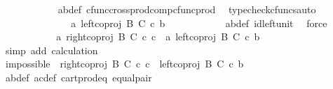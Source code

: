 \begin{isabellebody}
\ \ \ \ \ \ \ \ \ \ \isamarkupfalse%
\ a{\isacharprime}{\kern0pt}b{\isacharprime}{\kern0pt}{\isacharunderscore}{\kern0pt}def\ cfunc{\isacharunderscore}{\kern0pt}cross{\isacharunderscore}{\kern0pt}prod{\isacharunderscore}{\kern0pt}comp{\isacharunderscore}{\kern0pt}cfunc{\isacharunderscore}{\kern0pt}prod\ \isamarkupfalse%
\ {\isacharparenleft}{\kern0pt}typecheck{\isacharunderscore}{\kern0pt}cfuncs{\isacharcomma}{\kern0pt}auto{\isacharparenright}{\kern0pt}\isanewline
\ \ \ \ \ \ \ \ \isamarkupfalse%
\ \isamarkupfalse%
\ {\isachardoublequoteopen}{\isachardot}{\kern0pt}{\isachardot}{\kern0pt}{\isachardot}{\kern0pt}\ {\isacharequal}{\kern0pt}\ \ {\isasymlangle}a{\isacharprime}{\kern0pt}{\isacharcomma}{\kern0pt}\ left{\isacharunderscore}{\kern0pt}coproj\ B\ C\ {\isasymcirc}\isactrlsub c\ b{\isacharprime}{\kern0pt}{\isasymrangle}{\isachardoublequoteclose}\isanewline
\ \ \ \ \ \ \ \ \ \ \isamarkupfalse%
\ a{\isacharprime}{\kern0pt}b{\isacharprime}{\kern0pt}{\isacharunderscore}{\kern0pt}def\ id{\isacharunderscore}{\kern0pt}left{\isacharunderscore}{\kern0pt}unit{}\ \isamarkupfalse%
\ force\isanewline
\ \ \ \ \ \ \ \ \isamarkupfalse%
\ \isamarkupfalse%
\ {\isachardoublequoteopen}{\isasymlangle}a{\isacharcomma}{\kern0pt}\ right{\isacharunderscore}{\kern0pt}coproj\ B\ C\ {\isasymcirc}\isactrlsub c\ c{\isasymrangle}\ {\isacharequal}{\kern0pt}\ {\isasymlangle}a{\isacharprime}{\kern0pt}{\isacharcomma}{\kern0pt}\ left{\isacharunderscore}{\kern0pt}coproj\ B\ C\ {\isasymcirc}\isactrlsub c\ b{\isacharprime}{\kern0pt}{\isasymrangle}{\isachardoublequoteclose}\isanewline
\ \ \ \ \ \ \ \ \ \ \isamarkupfalse%
\ {\isacharparenleft}{\kern0pt}simp\ add{\isacharcolon}{\kern0pt}\ calculation{\isacharparenright}{\kern0pt}\isanewline
\ \ \ \ \ \ \isamarkupfalse%
\ \ \ \ \ \ \ \ \isanewline
\ \ \ \ \ \ \isamarkupfalse%
\ \isamarkupfalse%
\ impossible{\isacharcolon}{\kern0pt}\ \ {\isachardoublequoteopen}right{\isacharunderscore}{\kern0pt}coproj\ B\ C\ {\isasymcirc}\isactrlsub c\ c\ {\isacharequal}{\kern0pt}\ left{\isacharunderscore}{\kern0pt}coproj\ B\ C\ {\isasymcirc}\isactrlsub c\ b{\isacharprime}{\kern0pt}{\isachardoublequoteclose}\isanewline
\ \ \ \ \ \ \ \ \ \ \isamarkupfalse%
\ a{\isacharprime}{\kern0pt}b{\isacharprime}{\kern0pt}{\isacharunderscore}{\kern0pt}def\ ac{\isacharunderscore}{\kern0pt}def\ cart{\isacharunderscore}{\kern0pt}prod{\isacharunderscore}{\kern0pt}eq{}\ equal{\isacharunderscore}{\kern0pt}pair\ \isamarkupfalse%

\end{isabellebody}
